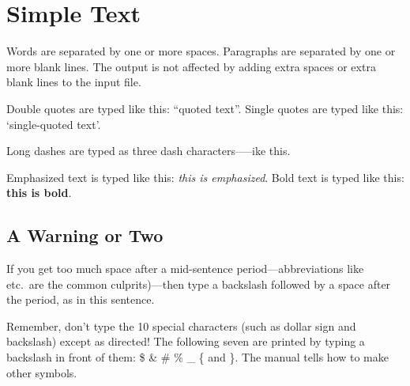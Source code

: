 \documentclass{article}        %
\begin{document}


\section{Simple Text}          %

Words are separated by one or more spaces.  Paragraphs are separated by
one or more blank lines.  The output is not affected by adding extra
spaces or extra blank lines to the input file.

Double quotes are typed like this: ``quoted text''.
Single quotes are typed like this: `single-quoted text'.

Long dashes are typed as three dash characters-----ike this.

Emphasized text is typed like this: \emph{this is emphasized}.
Bold       text is typed like this: \textbf{this is bold}.

\subsection{A Warning or Two}  %

If you get too much space after a mid-sentence period---abbreviations
like etc.\ are the common culprits)---then type a backslash followed by
a space after the period, as in this sentence.

Remember, don't type the 10 special characters (such as dollar sign and
backslash) except as directed!  The following seven are printed by
typing a backslash in front of them:  \$  \&  \#  \%  \_  \{  and  \}.
The manual tells how to make other symbols.
\end{document}
